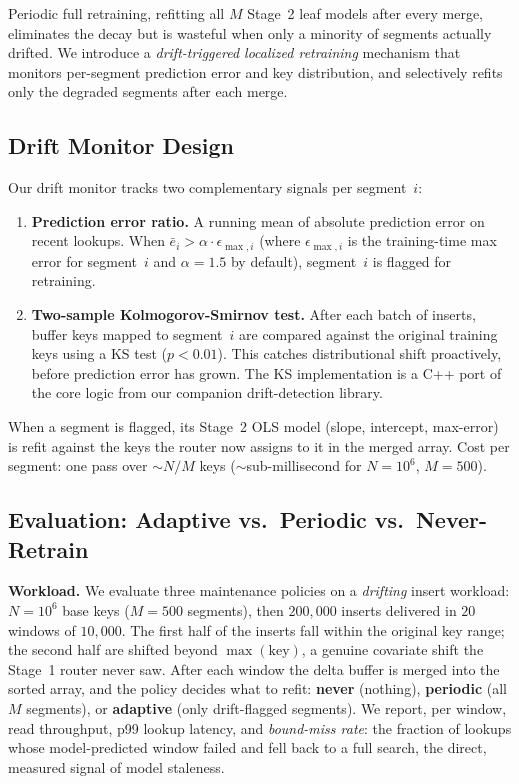 \documentclass[sigconf,nonacm]{acmart}
\begin{document}
Periodic full retraining, refitting all $M$ Stage~2 leaf models after every merge, eliminates the decay but is wasteful when only a minority of segments actually drifted. We introduce a \textit{drift-triggered localized retraining} mechanism that monitors per-segment prediction error and key distribution, and selectively refits only the degraded segments after each merge.

\subsection{Drift Monitor Design}

Our drift monitor tracks two complementary signals per segment~$i$:

\begin{enumerate}
    \item \textbf{Prediction error ratio.} A running mean of absolute prediction error on recent lookups. When $\bar{e}_i > \alpha \cdot \epsilon_{\max,i}$ (where $\epsilon_{\max,i}$ is the training-time max error for segment~$i$ and $\alpha = 1.5$ by default), segment~$i$ is flagged for retraining.
    \item \textbf{Two-sample Kolmogorov-Smirnov test.} After each batch of inserts, buffer keys mapped to segment~$i$ are compared against the original training keys using a KS test ($p < 0.01$). This catches distributional shift proactively, before prediction error has grown. The KS implementation is a C++ port of the core logic from our companion drift-detection library.
\end{enumerate}

When a segment is flagged, its Stage~2 OLS model (slope, intercept, max-error) is refit against the keys the router now assigns to it in the merged array. Cost per segment: one pass over $\sim N/M$ keys ($\sim$sub-millisecond for $N=10^6$, $M=500$).

\subsection{Evaluation: Adaptive vs.\ Periodic vs.\ Never-Retrain}

\noindent\textbf{Workload.} We evaluate three maintenance policies on a \textit{drifting} insert workload: $N=10^6$ base keys ($M=500$ segments), then $200{,}000$ inserts delivered in $20$ windows of $10{,}000$. The first half of the inserts fall within the original key range; the second half are shifted beyond $\max(\text{key})$, a genuine covariate shift the Stage~1 router never saw. After each window the delta buffer is merged into the sorted array, and the policy decides what to refit: \textbf{never} (nothing), \textbf{periodic} (all $M$ segments), or \textbf{adaptive} (only drift-flagged segments). We report, per window, read throughput, p99 lookup latency, and \textit{bound-miss rate}: the fraction of lookups whose model-predicted window failed and fell back to a full search, the direct, measured signal of model staleness.
\end{document}
